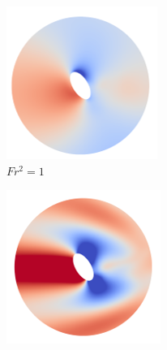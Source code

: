 \begin{figure}
    \begin{subfigure}[b]{0.25\textwidth}
        \centering
        \includegraphics[width=\textwidth]{images/spinning_ellipse/par0p5fs1.png}
        \caption{$Fr^2 = 1$}
        \label{fig:par0p5fs1}
    \end{subfigure}
    \hfill
    \begin{subfigure}[b]{0.25\textwidth}
        \centering
        \includegraphics[width=\textwidth]{images/spinning_ellipse/par0p5fs0p1.png}

\end{subfigure}
\end{figure}
